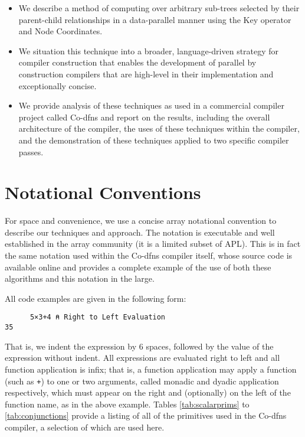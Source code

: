 \documentclass[numbers,preprint]{sigplanconf}
\begin{document}
\begin{itemize}[noitemsep]

\item We describe a method of computing over arbitrary sub-trees
selected by their parent-child relationships in a data-parallel manner
using the Key operator and Node Coordinates.

\item We situation this technique into a broader, language-driven 
strategy for compiler construction that enables the development of parallel 
by construction compilers that are high-level in their implementation and 
exceptionally concise.

\item We provide analysis of these techniques as used in a commercial
compiler project called Co-dfns and report on the results,
including the overall architecture of the compiler, the uses of these 
techniques within the compiler, and the demonstration of these techniques 
applied to two specific compiler passes.

\end{itemize}

\section{Notational Conventions}

For space and convenience, we use a concise array notational convention to 
describe our techniques and approach. The notation is executable and well 
established in the array community (it is a limited subset of APL). This is 
in fact the same notation used within the Co-dfns compiler itself, whose 
source code is available online and provides a complete example of the use 
of both these algorithms and this notation in the large. 

All code examples are given in the following form:

\begin{verbatim}
      5×3+4 ⍝ Right to Left Evaluation
35
\end{verbatim}

That is, we indent the expression by 6 spaces, followed by the value
of the expression without indent. All expressions are evaluated right to 
left and all function application is infix; that is, a function 
application may apply a function (such as \verb;+;) to one or two arguments, 
called monadic and dyadic application respectively,
which must appear on the right and (optionally) on the left of the function 
name, as in the above example. Tables \ref{tab:scalarprims} to 
\ref{tab:conjunctions}
provide a listing of all of the primitives used in the Co-dfns compiler, 
a selection of which are used here. 
\end{document}
